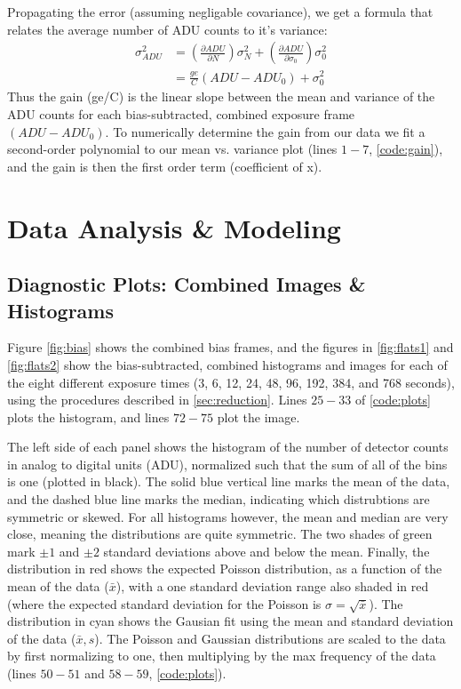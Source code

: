 \documentclass[preprint]{aastex62}
\begin{document}
Propagating the error (assuming negligable covariance), we get a formula that relates the average number of ADU counts to it's variance:
\begin{align}
\sigma_{ADU}^2 &= \left(\frac{\partial ADU}{\partial N} \right) \sigma_N^2 + 
    \left(\frac{\partial ADU}{\partial \sigma_0} \right) \sigma_0^2 \\
    &= \frac{ge}{C} \left(ADU - ADU_0 \right) + \sigma_0^2
\end{align}
Thus the gain (ge/C) is the linear slope between the mean and variance of the ADU counts for each bias-subtracted, combined exposure frame $\left(ADU - ADU_0 \right)$. To numerically determine the gain from our data we fit a second-order polynomial to our mean vs. variance plot (lines $1-7$, \ref{code:gain}), and the gain is then the first order term (coefficient of x).

\section{Data Analysis \& Modeling}

\subsection{Diagnostic Plots: Combined Images \& Histograms} \label{subsec:diagnostic}
Figure \ref{fig:bias} shows the combined bias frames, and the figures in \ref{fig:flats1} and \ref{fig:flats2} show the bias-subtracted, combined histograms and images for each of the eight different exposure times (3, 6, 12, 24, 48, 96, 192, 384, and 768 seconds), using the procedures described in \ref{sec:reduction}. Lines $25-33$ of \ref{code:plots} plots the histogram, and lines $72-75$ plot the image.

The left side of each panel shows the histogram of the number of detector counts in analog to digital units (ADU), normalized such that the sum of all of the bins is one (plotted in black). The solid blue vertical line marks the mean of the data, and the dashed blue line marks the median, indicating which distrubtions are symmetric or skewed. For all histograms however, the mean and median are very close, meaning the distributions are quite symmetric. The two shades of green mark $\pm1$ and $\pm2$ standard deviations above and below the mean. Finally, the distribution in red shows the expected Poisson distribution, as a function of the mean of the data ($\bar{x}$), with a one standard deviation range also shaded in red (where the expected standard deviation for the Poisson is $\sigma=\sqrt{\bar{x}}$). The distribution in cyan shows the Gausian fit using the mean and standard deviation of the data ($\bar{x}, s$). The Poisson and Gaussian distributions are scaled to the data by first normalizing to one, then multiplying by the max frequency of the data (lines $50-51$ and $58-59$, \ref{code:plots}).
\end{document}
